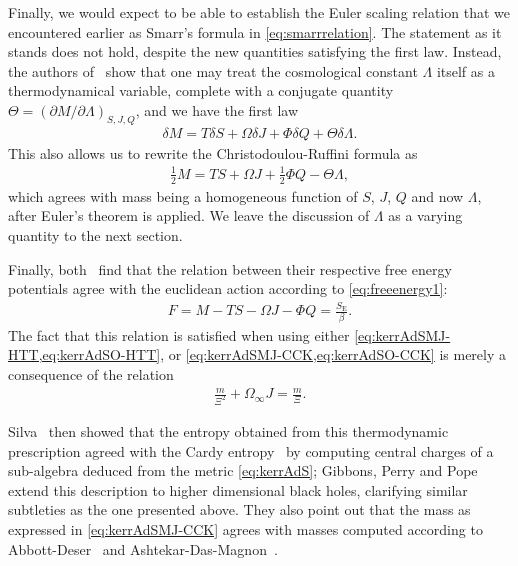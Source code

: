 \documentclass[
twoside,
openright,
frontopenright,
]{dmathesis}
\begin{document}
Finally, we would expect to be able to establish the Euler scaling relation that
we encountered earlier as Smarr's formula in \cref{eq:smarrrelation}. The
statement as it stands does not hold, despite the new quantities satisfying the
first law. Instead, the authors of~\cite{Caldarelli:1999xj} show that one may
treat the cosmological constant $\Lambda$ itself as a thermodynamical variable,
complete with a conjugate quantity
$\Theta = (\partial M/ \partial \Lambda)_{S,J,Q}$, and we have the first law
\begin{align}
  \delta M = T\delta S + \Omega \delta J + \Phi \delta Q + \Theta \delta \Lambda.
\end{align}
This also allows us to rewrite the Christodoulou-Ruffini formula as
\begin{align}
  \label{eq:smarrAdS1}
  \frac12 M= TS + \Omega J + \frac12 \Phi Q - \Theta \Lambda,
\end{align}
which agrees with mass being a homogeneous function of $S$, $J$, $Q$ and now
$\Lambda$, after Euler's theorem is applied. We leave the discussion of
$\Lambda$ as a varying quantity to the next section.

Finally, both~\cite{Hawking:1998kw,Caldarelli:1999xj} find that the relation
between their respective free energy potentials agree with the euclidean action
according to \cref{eq:freeenergy1}:
\begin{align}
  F = M- TS - \Omega J-\Phi Q = \frac{S_\mathrm{E}}{\beta}.
\end{align}
The fact that this relation is satisfied when using either
\cref{eq:kerrAdSMJ-HTT,eq:kerrAdSO-HTT}, or
\cref{eq:kerrAdSMJ-CCK,eq:kerrAdSO-CCK} is merely a consequence of the relation
\begin{align*}
  \frac{m}{\Xi^2}+\Omega_\infty J = \frac{m}{\Xi}.
\end{align*}

Silva~\cite{Silva:2002jq} then showed that the entropy obtained from this
thermodynamic prescription agreed with the Cardy
entropy~\cite{Cardy:1986ie,Bloete:1986qm} by computing central charges of a
sub-algebra deduced from the metric \cref{eq:kerrAdS}; Gibbons, Perry and
Pope~\cite{Gibbons:2004ai} extend this description to higher dimensional black
holes, clarifying similar subtleties as the one presented above. They also point
out that the mass as expressed in \cref{eq:kerrAdSMJ-CCK} agrees with masses
computed according to Abbott-Deser~\cite{Abbott:1981ff} and
Ashtekar-Das-Magnon~\cite{Ashtekar:1984zz,Ashtekar:1999jx}.
\end{document}
